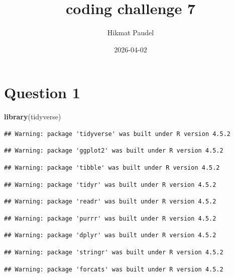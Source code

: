 \documentclass[
]{article}
\title{coding challenge 7}
\author{Hikmat Paudel}
\date{2026-04-02}
\newenvironment{Shaded}{\begin{snugshade}}{\end{snugshade}}
\newcommand{\FunctionTok}[1]{\textcolor[rgb]{0.13,0.29,0.53}{\textbf{#1}}}
\newcommand{\NormalTok}[1]{#1}
\begin{document}
\maketitle

\section{Question 1}\label{question-1}

\begin{Shaded}
\begin{Highlighting}[]
\FunctionTok{library}\NormalTok{(tidyverse)}
\end{Highlighting}
\end{Shaded}

\begin{verbatim}
## Warning: package 'tidyverse' was built under R version 4.5.2
\end{verbatim}

\begin{verbatim}
## Warning: package 'ggplot2' was built under R version 4.5.2
\end{verbatim}

\begin{verbatim}
## Warning: package 'tibble' was built under R version 4.5.2
\end{verbatim}

\begin{verbatim}
## Warning: package 'tidyr' was built under R version 4.5.2
\end{verbatim}

\begin{verbatim}
## Warning: package 'readr' was built under R version 4.5.2
\end{verbatim}

\begin{verbatim}
## Warning: package 'purrr' was built under R version 4.5.2
\end{verbatim}

\begin{verbatim}
## Warning: package 'dplyr' was built under R version 4.5.2
\end{verbatim}

\begin{verbatim}
## Warning: package 'stringr' was built under R version 4.5.2
\end{verbatim}

\begin{verbatim}
## Warning: package 'forcats' was built under R version 4.5.2
\end{verbatim}
\end{document}
